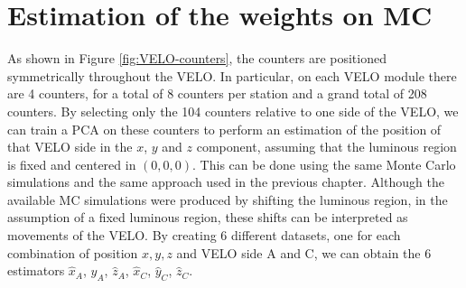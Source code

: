 \section{Estimation of the weights on MC}
As shown in Figure \ref{fig:VELO-counters}, the counters are positioned symmetrically throughout the VELO. In particular, on each VELO module there are 4 counters, for a total of 8 counters per station and a grand total of 208 counters. By selecting only the 104 counters relative to one side of the VELO, we can train a PCA on these counters to perform an estimation of the position of that VELO side in the $x$, $y$ and $z$ component, assuming that the luminous region is fixed and centered in $(0,0,0)$. This can be done using the same Monte Carlo simulations and the same approach used in the previous chapter. Although the available MC simulations were produced by shifting the luminous region, in the assumption of a fixed luminous region, these shifts can be interpreted as movements of the VELO. By creating 6 different datasets, one for each combination of position $x,y,z$ and VELO side A and C, we can obtain the 6 estimators $\hat{x}_A$, $\hat{y}_A$, $\hat{z}_A$, $\hat{x}_C$, $\hat{y}_C$, $\hat{z}_C$.  

